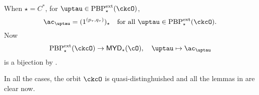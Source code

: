 \documentclass[12pt,a4paper]{amsart}
\def\MYD{{\mathsf{MYD}}}
\def\Forall{\text{for all }}
\numberwithin{equation}{section}
\newtheorem{lem}[thm]{Lemma}
\theoremstyle{remark}
\def\dpeNil{\Nil^{\mathrm{dpe}}}
\def\ssign{\mathrm{Sign}}
\def\Thetab{\bar{\Theta}}
\def\drc{\mathrm{DRC}}
\def\LLS{\mathrm{{}^{\ell} LS}}
\def\PBPes{\mathrm{PBP}^{\mathrm{ext}}_{\star}}
\def\uptaup{\uptau^{\prime}}
\begin{document}
When $\star = C^{*}$, for $\uptau\in \PBPes(\ckcO)$,
\[
  \ac_{\uptau} = (1^{(p_{\tau},q_{\tau})})_{\star}\quad \Forall \uptau\in \PBPes(\ckcO).
\]
Now
\[
    \PBPes(\ckcO) \rightarrow  \MYD_{\star}(\cO), \quad
    \uptau \mapsto \ac_{\uptau}
\]
is a bijection by .

In all the cases, the orbit $\ckcO$ is quasi-distinghuished and all the lemmas
in  are clear now.





\end{document}
